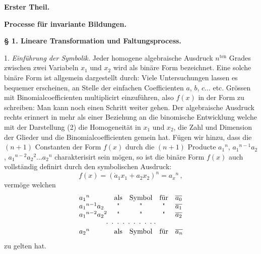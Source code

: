 \begin{center}
\textbf{Erster Theil.}
\end{center}

\begin{center}
\textbf{Processe für invariante Bildungen.}
\end{center}

\begin{center}
\textbf{§ 1. Lineare Transformation und Faltungsprocess.}
\end{center}

1. \textit{Einführung der Symbolik.} Jeder homogene algebraische Ausdruck $n^{\text{ten}}$ Grades zwischen zwei Variabeln $x_1$ und $x_2$ wird als \glqq binäre Form\grqq{} bezeichnet. Eine solche binäre Form ist allgemein dargestellt durch:
Viele Untersuchungen lassen es bequemer erscheinen, an Stelle der einfachen Coefficienten $a$, $b$, $c \ldots$ etc. Grössen mit Binomialcoefficienten multiplicirt einzuführen, also $f(x)$ in der Form zu schreiben:
Man kann noch einen Schritt weiter gehen. Der algebraische Ausdruck rechts erinnert in mehr als einer Beziehung an die binomische Entwicklung
welche mit der Darstellung (2) die Homogeneität in $x_1$ und $x_2$, die Zahl und Dimension der Glieder und die Binomialcoefficienten gemein hat. Fügen wir hinzu, dass die $(n+1)$ Constanten der Form $f(x)$ durch die $(n+1)$ Producte $a_1{}^n$, $a_1{}^{n-1}a_2$, $a_1{}^{n-2}a_2{}^2\ldots a_2{}^n$ charakterisirt sein mögen, so ist die binäre Form $f(x)$ auch vollständig definirt durch den symbolischen Ausdruck:
\[
f(x) = (\dot a_1x_1 + a_2x_2)^n = a_x{}^n\,,
\]
vermöge welchen
\[
\begin{array}{lcccl}
a_1{}^n & \text{als} & \text{Symbol} & \text{für} & \overline{a_0} \\
a_1{}^{n-1}a_2 & \text{\textquotedbl} & \text{\textquotedbl} & \text{\textquotedbl} & \overline{a_1} \\
a_1{}^{n-2}a_2{}^2 & \text{\textquotedbl} & \text{\textquotedbl} & \text{\textquotedbl} & \overline{a_2} \\
\multicolumn{5}{c}{\cdot\;\cdot\;\cdot\;\cdot\;\cdot\;\cdot\;\cdot\;\cdot\;\cdot\;\cdot} \\
a_2{}^n & \text{als} & \text{Symbol} & \text{für} & \overline{a_n}
\end{array}
\]
zu gelten hat.


